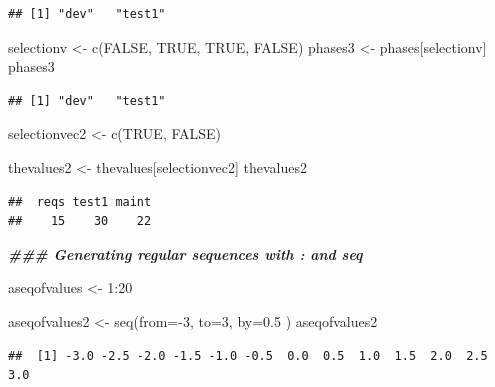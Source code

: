 \documentclass[
]{book}
\newenvironment{Shaded}{\begin{snugshade}}{\end{snugshade}}
\newcommand{\AttributeTok}[1]{\textcolor[rgb]{0.77,0.63,0.00}{#1}}
\newcommand{\ConstantTok}[1]{\textcolor[rgb]{0.00,0.00,0.00}{#1}}
\newcommand{\DecValTok}[1]{\textcolor[rgb]{0.00,0.00,0.81}{#1}}
\newcommand{\DocumentationTok}[1]{\textcolor[rgb]{0.56,0.35,0.01}{\textbf{\textit{#1}}}}
\newcommand{\FloatTok}[1]{\textcolor[rgb]{0.00,0.00,0.81}{#1}}
\newcommand{\FunctionTok}[1]{\textcolor[rgb]{0.00,0.00,0.00}{#1}}
\newcommand{\NormalTok}[1]{#1}
\newcommand{\OtherTok}[1]{\textcolor[rgb]{0.56,0.35,0.01}{#1}}
\newcommand{\SpecialCharTok}[1]{\textcolor[rgb]{0.00,0.00,0.00}{#1}}
\begin{document}
\begin{verbatim}
## [1] "dev"   "test1"
\end{verbatim}

\begin{Shaded}
\begin{Highlighting}[]
\NormalTok{selectionv }\OtherTok{\textless{}{-}} \FunctionTok{c}\NormalTok{(}\ConstantTok{FALSE}\NormalTok{, }\ConstantTok{TRUE}\NormalTok{, }\ConstantTok{TRUE}\NormalTok{, }\ConstantTok{FALSE}\NormalTok{)}
\NormalTok{phases3 }\OtherTok{\textless{}{-}}\NormalTok{ phases[selectionv]}
\NormalTok{phases3}
\end{Highlighting}
\end{Shaded}

\begin{verbatim}
## [1] "dev"   "test1"
\end{verbatim}

\begin{Shaded}
\begin{Highlighting}[]
\NormalTok{selectionvec2 }\OtherTok{\textless{}{-}} \FunctionTok{c}\NormalTok{(}\ConstantTok{TRUE}\NormalTok{, }\ConstantTok{FALSE}\NormalTok{)}

\NormalTok{thevalues2 }\OtherTok{\textless{}{-}}\NormalTok{ thevalues[selectionvec2]}
\NormalTok{thevalues2}
\end{Highlighting}
\end{Shaded}

\begin{verbatim}
##  reqs test1 maint 
##    15    30    22
\end{verbatim}

\begin{Shaded}
\begin{Highlighting}[]
\DocumentationTok{\#\#\# Generating regular sequences with  \textasciigrave{}:\textasciigrave{} and \textasciigrave{}seq\textasciigrave{}}

\NormalTok{aseqofvalues }\OtherTok{\textless{}{-}} \DecValTok{1}\SpecialCharTok{:}\DecValTok{20}

\NormalTok{aseqofvalues2 }\OtherTok{\textless{}{-}} \FunctionTok{seq}\NormalTok{(}\AttributeTok{from=}\SpecialCharTok{{-}}\DecValTok{3}\NormalTok{, }\AttributeTok{to=}\DecValTok{3}\NormalTok{, }\AttributeTok{by=}\FloatTok{0.5}\NormalTok{ )}
\NormalTok{aseqofvalues2}
\end{Highlighting}
\end{Shaded}

\begin{verbatim}
##  [1] -3.0 -2.5 -2.0 -1.5 -1.0 -0.5  0.0  0.5  1.0  1.5  2.0  2.5  3.0
\end{verbatim}
\end{document}
